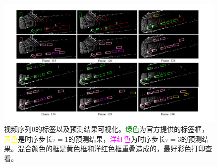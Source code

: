 \begin{figure}[!t]
	\centering
	\includegraphics[trim={2cm, 1cm, 2.5cm, 1cm}, clip, width=\textwidth]{./imgs/examples.pdf}
	\vspace{-1.0cm}
	\caption{视频序列0的标签以及预测结果可视化。\textcolor{green}{绿色}为官方提供的标签框， \textcolor{yellow}{黄色}是时序步长$\tau = 1$的预测结果，\textcolor{magenta}{洋红色}为时序步长$\tau = 3$的预测结果。混合颜色的框是黄色框和洋红色框重叠造成的，最好彩色打印查看。}
	\label{fig:examples}
\end{figure}
